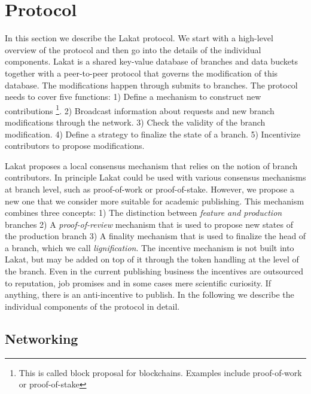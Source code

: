 
\section{Protocol}
\label{sc:protocol}

In this section we describe the Lakat protocol. We start with a high-level overview of the protocol and then go into the details of the individual components. Lakat is a shared key-value database of branches and data buckets together with a peer-to-peer protocol that governs the modification of this database. The modifications happen through submits to branches. The protocol needs to cover five functions: 1) Define a mechanism to construct new contributions \footnote{This is called block proposal for blockchains. Examples include proof-of-work or proof-of-stake}. 2) Broadcast information about requests and new branch modifications through the network. 3) Check the validity of the branch modification. 4) Define a strategy to finalize the state of a branch. 5) Incentivize contributors to propose modifications. 

Lakat proposes a local consensus mechanism that relies on the notion of branch contributors. In principle Lakat could be used with various consensus mechanisms at branch level, such as proof-of-work or proof-of-stake. However, we propose a new one that we consider more suitable for academic publishing. This mechanism combines three concepts: 1) The distinction between \textit{feature and production} branches 2) A \textit{proof-of-review} mechanism that is used to propose new states of the production branch 3) A finality mechanism that is used to finalize the head of a branch, which we call \textit{lignification}. The incentive mechanism is not built into Lakat, but may be added on top of it through the token handling at the level of the branch. Even in the current publishing business the incentives are outsourced to reputation, job promises and in some cases mere scientific curiosity. If anything, there is an anti-incentive to publish. In the following we describe the individual components of the protocol in detail.

\subsection{Networking}
\label{ssc:networking}

